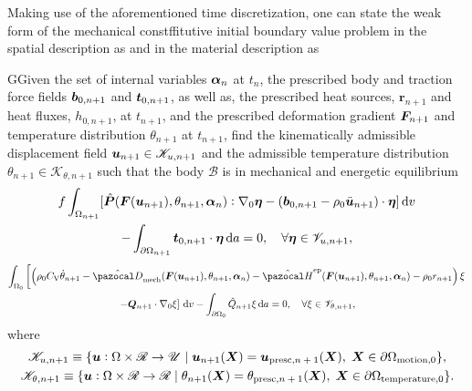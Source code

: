 Making use of the aforementioned time discretization, one can state the weak form of the mechanical constffitutive initial boundary value problem in the spatial description as
and in the material description as
\begin{problem}
    GGiven the set of internal variables $\bm{\alpha}_n$ at $t_n$, the prescribed body and traction force fields $\bm{b}_{0,n+1}$ and $\bm{t}_{0,n+1}$, as well as, the prescribed heat sources, \(\bm r_{n+1}\) and heat fluxes, \(h_{0,n+1}\), at $t_{n+1}$, and the prescribed deformation gradient $\bm{F}_{n+1}$ and temperature distribution \(\theta_{n+1}\) at $t_{n+1}$, find the kinematically admissible displacement field $\bm{u}_{n+1}\in\mathscr{K}_{u,n+1}$ and the admissible temperature distribution \(\theta_{n+1}\in\mathscr K_{\theta,n+1}\) such that the body $\mathscr{B}$ is in mechanical and energetic equilibrium
            \begin{multline}f
        \int_{\Omega_{n+1}} [\hat{\bm{P}}(\bm{F}(\bm u_{n+1}), \theta_{n+1}, \bm{\alpha}_n):\nabla_0 \bm{\eta} - (\bm{b}_{0,n+1}-\rho_0\ddot{\bm u}_{n+1})\cdot \bm{\eta}]\,\mathrm{d} v\\ - \int_{\partial\Omega_{n+1}} \bm{t}_{0,n+1}\cdot \bm{\eta}\,\mathrm{d} a = 0,\quad \forall \bm{\eta} \in \mathscr{V}_{u,n+1},
        \end{multline}
        \begin{multline}
        \int_{\Omega_0}   \left[\left(\rho_0C_\mathrm{V}\dot\theta_{n+1} -\hat{\pazocal D}_\text{mech}(\bm F(\bm u_{n+1}), \theta_{n+1}, \bm \alpha_n) - \hat{\pazocal H}^\text{ep}(\bm{F}(\bm u_{n+1}), \theta_{n+1}, \bm \alpha_n)- \rho_0 r_{n+1} \right) \xi\right.\\
        \left. - \bm Q_{n+1}\cdot \nabla_0 \xi\right]\ud v - \int_{\partial\Omega_0} \hat Q_{n+1} \xi\ud a = 0,\quad \forall \xi \in \mathscr{V}_{\theta,n+1},
    \end{multline}
    where
    \begin{gather}
            \mathscr{K}_{u,n+1}\equiv \{\bm{u}:\Omega\times \mathscr{R}\to \mathscr{U}\;|\;\bm{u}_{n+1}(\bm{X}) = \bm{u}_\text{presc,$n+1$}(\bm{X}),\;\bm{X}\in\partial \Omega_\text{motion,0}\},\\
            \mathscr{K}_{\theta, n+1}\equiv \{\bm{u}:\Omega\times \mathscr{R}\to \mathscr{R}\;|\;\theta_{n+1}(\bm{X}) = \theta_\text{presc,$n+1$}(\bm{X}),\;\bm{X}\in\partial \Omega_\text{temperature,0}\}.
    \end{gather}
\end{problem}

